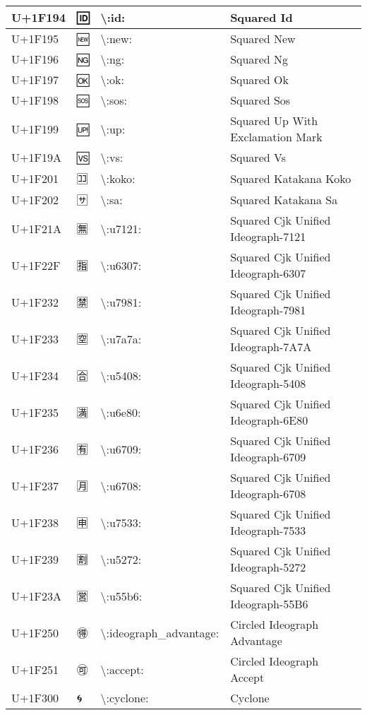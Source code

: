 \begin{table}[h]
\begin{tabulary}{\linewidth}{|L|L|L|L|}
\hline
U+1F194 & 🆔 & {\textbackslash}:id: & Squared Id \\
\hline
U+1F195 & 🆕 & {\textbackslash}:new: & Squared New \\
\hline
U+1F196 & 🆖 & {\textbackslash}:ng: & Squared Ng \\
\hline
U+1F197 & 🆗 & {\textbackslash}:ok: & Squared Ok \\
\hline
U+1F198 & 🆘 & {\textbackslash}:sos: & Squared Sos \\
\hline
U+1F199 & 🆙 & {\textbackslash}:up: & Squared Up With Exclamation Mark \\
\hline
U+1F19A & 🆚 & {\textbackslash}:vs: & Squared Vs \\
\hline
U+1F201 & 🈁 & {\textbackslash}:koko: & Squared Katakana Koko \\
\hline
U+1F202 & 🈂 & {\textbackslash}:sa: & Squared Katakana Sa \\
\hline
U+1F21A & 🈚 & {\textbackslash}:u7121: & Squared Cjk Unified Ideograph-7121 \\
\hline
U+1F22F & 🈯 & {\textbackslash}:u6307: & Squared Cjk Unified Ideograph-6307 \\
\hline
U+1F232 & 🈲 & {\textbackslash}:u7981: & Squared Cjk Unified Ideograph-7981 \\
\hline
U+1F233 & 🈳 & {\textbackslash}:u7a7a: & Squared Cjk Unified Ideograph-7A7A \\
\hline
U+1F234 & 🈴 & {\textbackslash}:u5408: & Squared Cjk Unified Ideograph-5408 \\
\hline
U+1F235 & 🈵 & {\textbackslash}:u6e80: & Squared Cjk Unified Ideograph-6E80 \\
\hline
U+1F236 & 🈶 & {\textbackslash}:u6709: & Squared Cjk Unified Ideograph-6709 \\
\hline
U+1F237 & 🈷 & {\textbackslash}:u6708: & Squared Cjk Unified Ideograph-6708 \\
\hline
U+1F238 & 🈸 & {\textbackslash}:u7533: & Squared Cjk Unified Ideograph-7533 \\
\hline
U+1F239 & 🈹 & {\textbackslash}:u5272: & Squared Cjk Unified Ideograph-5272 \\
\hline
U+1F23A & 🈺 & {\textbackslash}:u55b6: & Squared Cjk Unified Ideograph-55B6 \\
\hline
U+1F250 & 🉐 & {\textbackslash}:ideograph\_advantage: & Circled Ideograph Advantage \\
\hline
U+1F251 & 🉑 & {\textbackslash}:accept: & Circled Ideograph Accept \\
\hline
U+1F300 & 🌀 & {\textbackslash}:cyclone: & Cyclone \\

\end{tabulary}
\end{table}
